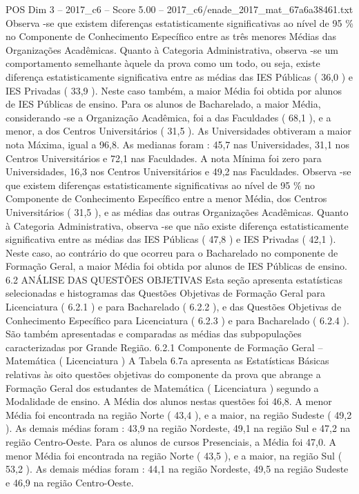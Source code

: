 \begin{textsample}{POS Dim 3 – 2017\_c6 – Score 5.00 – 2017\_c6/enade\_2017\_mat\_67a6a38461.txt}
Observa -se que existem diferenças estatisticamente significativas ao nível de 95 \% no Componente de Conhecimento Específico entre as três menores Médias das Organizações Acadêmicas.
Quanto à Categoria Administrativa, observa -se um comportamento semelhante àquele da prova como um todo, ou seja, existe diferença estatisticamente significativa entre as médias das IES Públicas ( 36,0 ) e IES Privadas ( 33,9 ).
Neste caso também, a maior Média foi obtida por alunos de IES Públicas de ensino.
Para os alunos de Bacharelado, a maior Média, considerando -se a Organização Acadêmica, foi a das Faculdades ( 68,1 ), e a menor, a dos Centros Universitários ( 31,5 ).
As Universidades obtiveram a maior nota Máxima, igual a 96,8.
As medianas foram : 45,7 nas Universidades, 31,1 nos Centros Universitários e 72,1 nas Faculdades.
A nota Mínima foi zero para Universidades, 16,3 nos Centros Universitários e 49,2 nas Faculdades.
Observa -se que existem diferenças estatisticamente significativas ao nível de 95 \% no Componente de Conhecimento Específico entre a menor Média, dos Centros Universitários ( 31,5 ), e as médias das outras Organizações Acadêmicas.
Quanto à Categoria Administrativa, observa -se que não existe diferença estatisticamente significativa entre as médias das IES Públicas ( 47,8 ) e IES Privadas ( 42,1 ).
Neste caso, ao contrário do que ocorreu para o Bacharelado no componente de Formação Geral, a maior Média foi obtida por alunos de IES Públicas de ensino. 6.2 ANÁLISE DAS QUESTÕES OBJETIVAS Esta seção apresenta estatísticas selecionadas e histogramas das Questões Objetivas de Formação Geral para Licenciatura ( 6.2.1 ) e para Bacharelado ( 6.2.2 ), e das Questões Objetivas de Conhecimento Específico para Licenciatura ( 6.2.3 ) e para Bacharelado ( 6.2.4 ).
São também apresentadas e comparadas as médias das subpopulações caracterizadas por Grande Região. 6.2.1 Componente de Formação Geral – Matemática ( Licenciatura ) A Tabela 6.7a apresenta as Estatísticas Básicas relativas às oito questões objetivas do componente da prova que abrange a Formação Geral dos estudantes de Matemática ( Licenciatura ) segundo a Modalidade de ensino.
A Média dos alunos nestas questões foi 46,8.
A menor Média foi encontrada na região Norte ( 43,4 ), e a maior, na região Sudeste ( 49,2 ).
As demais médias foram : 43,9 na região Nordeste, 49,1 na região Sul e 47,2 na região Centro-Oeste.
Para os alunos de cursos Presenciais, a Média foi 47,0.
A menor Média foi encontrada na região Norte ( 43,5 ), e a maior, na região Sul ( 53,2 ).
As demais médias foram : 44,1 na região Nordeste, 49,5 na região Sudeste e 46,9 na região Centro-Oeste.

\end{textsample}
